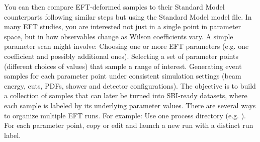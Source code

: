 \markdownRendererOlEndTight \markdownRendererInterblockSeparator
{}You can then compare EFT-deformed samples to their Standard Model counterparts following similar steps but using the Standard Model model file.\markdownRendererInterblockSeparator
{}\markdownRendererThematicBreak{}\markdownRendererInterblockSeparator
{}
\markdownRendererSectionEnd 
\markdownRendererSectionEnd \markdownRendererSectionBegin
{}\markdownRendererInterblockSeparator
{}In many EFT studies, you are interested not just in a single point in parameter space, but in how observables change as Wilson coefficients vary.\markdownRendererInterblockSeparator
{}\markdownRendererSectionBegin
{}\markdownRendererInterblockSeparator
{}A simple parameter scan might involve:\markdownRendererInterblockSeparator
{}\markdownRendererUlBeginTight
\markdownRendererUlItem Choosing one or more EFT parameters (e.g. one coefficient  and possibly additional ones).\markdownRendererUlItemEnd 
\markdownRendererUlItem Selecting a set of parameter points (different choices of  values) that sample a range of interest.\markdownRendererUlItemEnd 
\markdownRendererUlItem Generating event samples for each parameter point under consistent simulation settings (beam energy, cuts, PDFs, shower and detector configurations).\markdownRendererUlItemEnd 
\markdownRendererUlEndTight \markdownRendererInterblockSeparator
{}The objective is to build a collection of samples that can later be turned into SBI-ready datasets, where each sample is labeled by its underlying parameter values.\markdownRendererInterblockSeparator
{}
\markdownRendererSectionEnd \markdownRendererSectionBegin
{}\markdownRendererInterblockSeparator
{}There are several ways to organize multiple EFT runs. For example:\markdownRendererInterblockSeparator
{}\markdownRendererUlBegin
\markdownRendererUlItem {}\markdownRendererInterblockSeparator
{}\markdownRendererUlBeginTight
\markdownRendererUlItem Use one process directory (e.g. ).\markdownRendererUlItemEnd 
\markdownRendererUlItem For each parameter point, copy or edit  and launch a new run with a distinct run label.\markdownRendererUlItemEnd 
